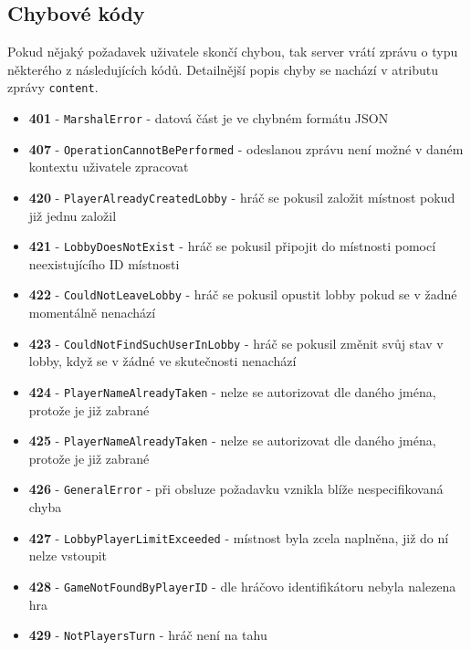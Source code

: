\documentclass[12pt, a4paper]{article}
\begin{document}
		\subsection{Chybové kódy}
		Pokud nějaký požadavek uživatele skončí chybou, tak server vrátí zprávu o typu některého z následujících kódů. Detailnější popis chyby se nachází v atributu zprávy \texttt{content}.
		\begin{itemize}
			\item \textbf{401} - \texttt{MarshalError} - datová část je ve chybném formátu JSON
			\item \textbf{407} - \texttt{OperationCannotBePerformed} - odeslanou zprávu není možné v daném kontextu uživatele zpracovat
			
			\item \textbf{420} - \texttt{PlayerAlreadyCreatedLobby} - hráč se pokusil založit místnost pokud již jednu založil

			\item \textbf{421} - \texttt{LobbyDoesNotExist} - hráč se pokusil připojit do místnosti pomocí neexistujícího ID místnosti
			
			\item \textbf{422} - \texttt{CouldNotLeaveLobby} - hráč se pokusil opustit lobby pokud se v žadné momentálně nenachází
	
			\item \textbf{423} - \texttt{CouldNotFindSuchUserInLobby} - hráč se pokusil změnit svůj stav v lobby, když se v žádné ve skutečnosti nenachází
			
			\item \textbf{424} - \texttt{PlayerNameAlreadyTaken} - nelze se autorizovat dle daného jména, protože je již zabrané

			\item \textbf{425} - \texttt{PlayerNameAlreadyTaken} - nelze se autorizovat dle daného jména, protože je již zabrané
			
			\item \textbf{426} - \texttt{GeneralError} - při obsluze požadavku vznikla blíže nespecifikovaná chyba
			
			\item \textbf{427} - \texttt{LobbyPlayerLimitExceeded} - místnost byla zcela naplněna, již do ní nelze vstoupit
			
			\item \textbf{428} - \texttt{GameNotFoundByPlayerID} - dle hráčovo identifikátoru nebyla nalezena hra
						
			\item \textbf{429} - \texttt{NotPlayersTurn} - hráč není na tahu
			

\end{itemize}
\end{document}
